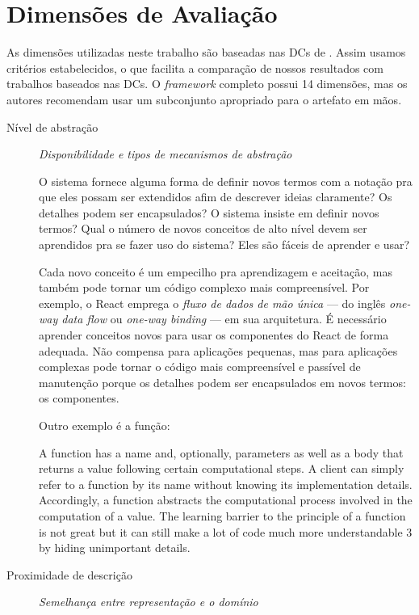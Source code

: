 
\section{Dimensões de Avaliação}
\label{sec:org050f7e0}
As dimensões utilizadas neste trabalho são baseadas nas DCs de
\textcite{green1989}. Assim usamos critérios estabelecidos, o que facilita a
comparação de nossos resultados com trabalhos baseados nas DCs. O \emph{framework}
completo possui 14 dimensões, mas os autores recomendam usar um subconjunto
apropriado para o artefato em mãos.

\begin{description}
\item[{Nível de abstração}] \emph{Disponibilidade e tipos de mecanismos de abstração}

O sistema fornece alguma forma de definir novos termos com a notação pra
que eles possam ser extendidos afim de descrever ideias claramente? Os
detalhes podem ser encapsulados? O sistema insiste em definir novos
termos? Qual o número de novos conceitos de alto nível devem ser
aprendidos pra se fazer uso do sistema? Eles são fáceis de aprender e
usar?

   Cada novo conceito é um empecilho pra aprendizagem e aceitação, mas
também pode tornar um código complexo mais compreensível. Por exemplo, o
React emprega o \emph{fluxo de dados de mão única} --- do inglês \emph{one-way data
flow} ou \emph{one-way binding} --- em sua arquitetura. É necessário aprender
conceitos novos para usar os componentes do React de forma adequada. Não
compensa para aplicações pequenas, mas para aplicações complexas pode tornar
o código mais compreensível e passível de manutenção porque os detalhes
podem ser encapsulados em novos termos: os componentes.

Outro exemplo é a função:

\begin{citacao}
  A function has a name and, optionally, parameters as well as a body that
  returns a value following certain computational steps. A client can simply
  refer to a function by its name without knowing its implementation details.
  Accordingly, a function abstracts the computational process involved in the
  computation of a value. The learning barrier to the principle of a function is
  not great but it can still make a lot of code much more understandable 3 by
  hiding unimportant details.
  \cite[p.~13]{kiss2014}
\end{citacao}

\item[{Proximidade de descrição}]  \emph{Semelhança entre representação e o domínio}


\end{description}
